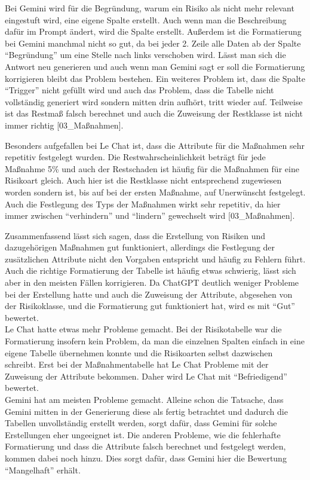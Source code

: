 Bei Gemini wird für die Begründung, warum ein Risiko als nicht mehr relevant eingestuft wird, eine eigene Spalte erstellt.
Auch wenn man die Beschreibung dafür im Prompt ändert, wird die Spalte erstellt. Außerdem ist die Formatierung bei Gemini
manchmal nicht so gut, da bei jeder 2. Zeile alle Daten ab der Spalte ``Begründung'' um eine Stelle nach links verschoben wird.
Lässt man sich die Antwort neu generieren und auch wenn man Gemini sagt er soll die Formatierung korrigieren bleibt das 
Problem bestehen. Ein weiteres Problem ist, dass die Spalte ``Trigger'' nicht gefüllt wird und auch das Problem, dass
die Tabelle nicht vollständig generiert wird sondern mitten drin aufhört, tritt wieder auf. Teilweise ist das Restmaß 
falsch berechnet und auch die Zuweisung der Restklasse ist nicht immer richtig [03\_Maßnahmen].

Besonders aufgefallen bei Le Chat ist, dass die Attribute für die Maßnahmen sehr repetitiv festgelegt wurden. Die Restwahrscheinlichkeit
beträgt für jede Maßnahme 5\% und auch der Restschaden ist häufig für die Maßnahmen für eine Risikoart gleich. Auch hier ist die 
Restklasse nicht entsprechend zugewiesen worden sondern ist, bis auf bei der ersten Maßnahme, auf Unerwünscht festgelegt. Auch 
die Festlegung des Typs der Maßnahmen wirkt sehr repetitiv, da hier immer zwischen ``verhindern'' und ``lindern'' gewechselt wird [03\_Maßnahmen].

Zusammenfassend lässt sich sagen, dass die Erstellung von Risiken und dazugehörigen Maßnahmen gut funktioniert, allerdings 
die Festlegung der zusätzlichen Attribute nicht den Vorgaben entspricht und häufig zu Fehlern führt. Auch die richtige 
Formatierung der Tabelle ist häufig etwas schwierig, lässt sich aber in den meisten Fällen korrigieren. Da ChatGPT deutlich 
weniger Probleme bei der Erstellung hatte und auch die Zuweisung der Attribute, abgesehen von der Risikoklasse, und die 
Formatierung gut funktioniert hat, wird es mit ``Gut'' bewertet.\\
Le Chat hatte etwas mehr Probleme gemacht. Bei der Risikotabelle war die Formatierung insofern kein Problem, da man die 
einzelnen Spalten einfach in eine eigene Tabelle übernehmen konnte und die Risikoarten selbst dazwischen schreibt. Erst 
bei der Maßnahmentabelle hat Le Chat Probleme mit der Zuweisung der Attribute bekommen. Daher wird Le Chat mit 
``Befriedigend'' bewertet.\\
Gemini hat am meisten Probleme gemacht. Alleine schon die Tatsache, dass Gemini mitten in der Generierung diese als 
fertig betrachtet und dadurch die Tabellen unvollständig erstellt werden, sorgt dafür, dass Gemini für solche Erstellungen 
eher ungeeignet ist. Die anderen Probleme, wie die fehlerhafte Formatierung und dass die Attribute falsch berechnet und 
festgelegt werden, kommen dabei noch hinzu. Dies sorgt dafür, dass Gemini hier die Bewertung ``Mangelhaft'' erhält.

